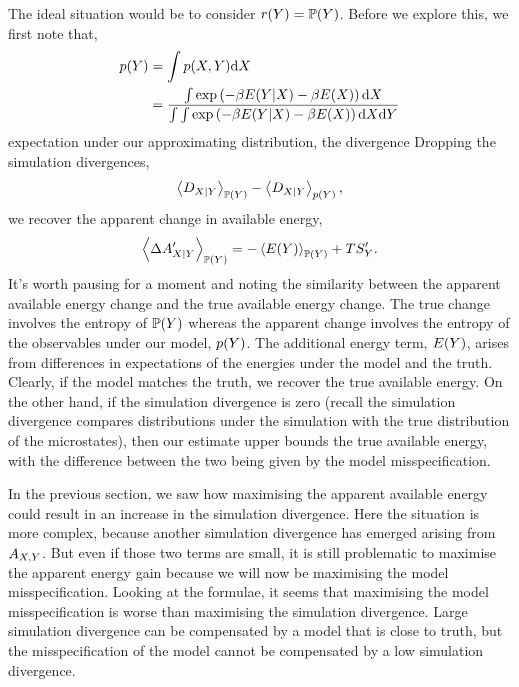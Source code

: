 \documentclass[]{article}
\begin{document}
The ideal situation would be to consider $r(Y)=\mathbb{P}(Y)$. Before we explore this, we first note that,
\begin{align*}
p(Y) & = \int p(X, Y) \text{d} X \\
& =\frac{\int \exp\left(-\beta E(Y|X) -\beta E(X) \right) \text{d} X}{\int \int \exp\left(-\beta E(Y|X) -\beta E(X) \right)\text{d} X \text{d} Y} 
\end{align*}
expectation under our approximating distribution, the divergence Dropping the simulation divergences, 
\[
\left\langle D_{X|Y} \right\rangle_{\mathbb{P}(Y)} - \left\langle D_{X|Y} \right\rangle_{p(Y)},
\]
we recover the apparent change in available energy,
\[
\left\langle \Delta A^\prime_{X|Y} \right\rangle_{\mathbb{P}(Y)} = -\left\langle E(Y) \right\rangle_{\mathbb{P}(Y)} + TS^\prime_Y.
\] 
It's worth pausing for a moment and noting the similarity between the apparent available energy change and the true available energy change. The true change involves the entropy of $\mathbb{P}(Y)$ whereas the apparent change involves the entropy of the observables under our model, $p(Y)$. The additional energy term, $E(Y)$, arises from differences in expectations of the energies under the model and the truth. Clearly, if the model matches the truth, we recover the true available energy. On the other hand, if the simulation divergence is zero (recall the simulation divergence compares distributions under the simulation with the true distribution of the microstates), then our estimate upper bounds the true available energy, with the difference between the two being given by the model misspecification. 

In the previous section, we saw how maximising the apparent available energy could result in an increase in the simulation divergence. Here the situation is more complex, because another simulation divergence has emerged arising from $A_{X,Y}$. But even if those two terms are small, it is still problematic to maximise the apparent energy gain because we will now be maximising the model misspecification. Looking at the formulae, it seems that maximising the model misspecification is worse than maximising the simulation divergence. Large simulation divergence can be compensated by a model that is close to truth, but the misspecification of the model cannot be compensated by a low simulation divergence.
\end{document}
